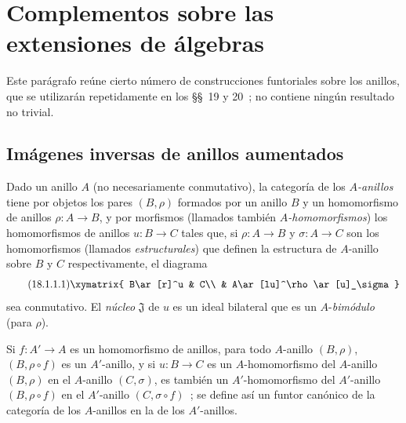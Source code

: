\section{Complementos sobre las extensiones de álgebras}
\label{section:0.18-es}

Este parágrafo reúne cierto número de construcciones funtoriales sobre
los anillos, que se utilizarán repetidamente en los \S\S~19 y 20~; no
contiene ningún resultado no trivial.

\subsection{Imágenes inversas de anillos aumentados}
\label{subsection:0.18.1-es}

\begin{env}[18.1.1]
\label{0.18.1.1-es}
Dado un anillo $A$ (no necesariamente conmutativo), la categoría de los
\emph{$A$-anillos} tiene por objetos los pares $(B,\rho)$ formados por un anillo
$B$ y un homomorfismo de anillos $\rho:A\to B$, y por morfismos (llamados también
\emph{$A$-homomorfismos}) los homomorfismos de anillos $u:B\to C$ tales que,
si $\rho:A\to B$ y $\sigma:A\to C$ son los homomorfismos (llamados
\emph{estructurales}) que definen la estructura de $A$-anillo sobre $B$ y $C$
respectivamente, el diagrama
\begin{equation}
\label{0.18.1.1.1-es}
\tag{18.1.1.1}
  \xymatrix{
    B\ar[r]^u & C\\
    & A\ar[lu]^\rho\ar[u]_\sigma
  }
\end{equation}
sea conmutativo. El \emph{núcleo} $\mathfrak{J}$ de $u$ es un ideal bilateral
que es un $A$-\emph{bimódulo} (para $\rho$).

Si $f:A'\to A$ es un homomorfismo de anillos, para todo $A$-anillo
$(B,\rho)$, $(B,\rho\circ f)$ es un $A'$-anillo, y si $u:B\to C$ es un
$A$-homomorfismo del $A$-anillo $(B,\rho)$
en el $A$-anillo $(C,\sigma)$, es también un $A'$-homomorfismo del
$A'$-anillo $(B,\rho\circ f)$ en el $A'$-anillo $(C,\sigma\circ f)$~; se
define así un funtor canónico de la categoría de los $A$-anillos en la de
los $A'$-anillos.
\end{env}

